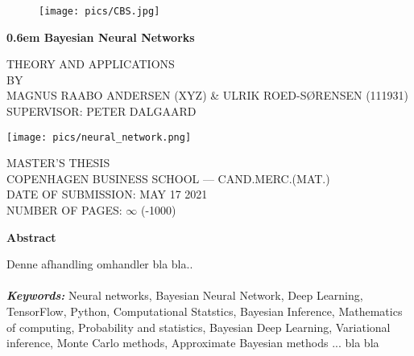 \documentclass[a4paper]{book}
\providecommand{\keywords}[1]
{
  \small	
  \textbf{\textit{Keywords:}} #1
}
\numberwithin{mytheorem}{chapter}
\numberwithin{equation}{section}
\begin{document}
\begin{titlepage}
\clearpage
\newcommand\nbvspace[1][3]{\vspace*{\stretch{#1}}}
\newcommand\nbstretchyspace{\spaceskip0.5em plus 0.25em minus 0.25em}
\newcommand{\nbtitlestretch}{\spaceskip0.6em}
\thispagestyle{empty}
\begin{center}
\begin{figure}
\begin{center}
\texttt{[image: pics/CBS.jpg]}
\end{center} 
\end{figure}
	\bfseries
	\Huge
	{\nbtitlestretch\huge
	 Bayesian Neural Networks}
	 \nbvspace[1]
	\normalsize
	
	THEORY AND APPLICATIONS\\
	\footnotesize BY\\
	\footnotesize MAGNUS RAABO ANDERSEN (XYZ) \& ULRIK ROED-SØRENSEN (111931)\\[0.5em]
	\footnotesize SUPERVISOR: PETER DALGAARD
	
	\nbvspace[1]
	
	\texttt{[image: pics/neural\_network.png]}
	\nbvspace[1]
	
	MASTER'S THESIS \\ 
	COPENHAGEN BUSINESS SCHOOL --- CAND.MERC.(MAT.)\\
    \nbvspace[1]
    DATE OF SUBMISSION: MAY 17 2021\\
    NUMBER OF PAGES: $\infty$ (-1000)
	
	\nbvspace[1]
\end{center}
\end{titlepage}

\thispagestyle{empty}
\begin{center}
    \Large
    \textbf{Abstract}
\end{center}
\vspace{0.9cm}
Denne afhandling omhandler bla bla.. %
\\
\\
\keywords{Neural networks, Bayesian Neural Network, Deep Learning, TensorFlow, Python, Computational Statstics, Bayesian Inference, Mathematics of computing, Probability and statistics, Bayesian Deep Learning, Variational inference, Monte Carlo methods, Approximate Bayesian methods ...  bla bla}
\frontmatter
\end{document}
